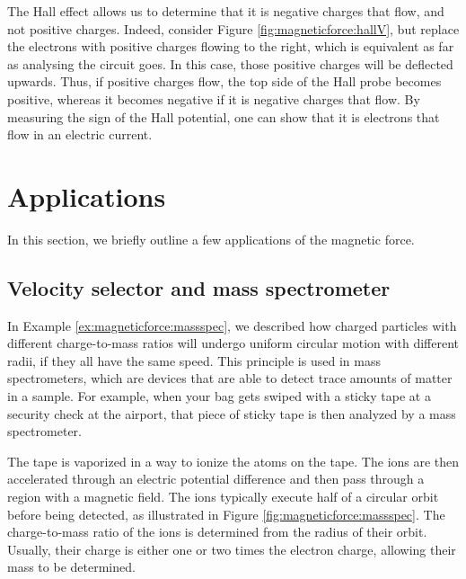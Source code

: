 The Hall effect allows us to determine that it is negative charges that flow, and not positive charges. Indeed, consider Figure \ref{fig:magneticforce:hallV}, but replace the electrons with positive charges flowing to the right, which is equivalent as far as analysing the circuit goes. In this case, those positive charges will be deflected upwards. Thus, if positive charges flow, the top side of the Hall probe becomes positive, whereas it becomes negative if it is negative charges that flow. By measuring the sign of the Hall potential, one can show that it is electrons that flow in an electric current.

\section{Applications}
In this section, we briefly outline a few applications of the magnetic force.
\subsection{Velocity selector and mass spectrometer}
In Example \ref{ex:magneticforce:massspec}, we described how charged particles with different charge-to-mass ratios will undergo uniform circular motion with different radii, if they all have the same speed. This principle is used in mass spectrometers, which are devices that are able to detect trace amounts of matter in a sample. For example, when your bag gets swiped with a sticky tape at a security check at the airport, that piece of sticky tape is then analyzed by a mass spectrometer.

The tape is vaporized in a way to ionize the atoms on the tape. The ions are then accelerated through an electric potential difference and then pass through a region with a magnetic field. The ions typically execute half of a circular orbit before being detected, as illustrated in Figure \ref{fig:magneticforce:massspec}. The charge-to-mass ratio of the ions is determined from the radius of their orbit. Usually, their charge is either one or two times the electron charge, allowing their mass to be determined. 

